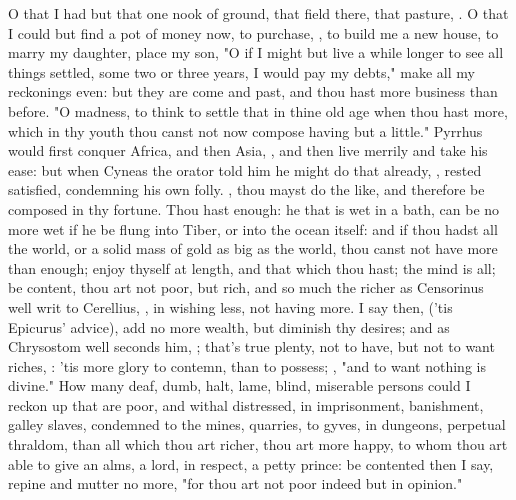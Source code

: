 {O that I had but that one nook of ground, that field there, that pasture, . O that I could but find a pot of money now, to purchase, \etc{}, to build me a new house, to marry my daughter, place my son, \etc{} "O if I might but live a while longer to see all things settled, some two or three years, I would pay my debts," make all my reckonings even: but they are come and past, and thou hast more business than before. "O madness, to think to settle that in thine old age when thou hast more, which in thy youth thou canst not now compose having but a little." Pyrrhus would first conquer Africa, and then Asia, , and then live merrily and take his ease: but when Cyneas the orator told him he might do that already, , rested satisfied, condemning his own folly. , thou mayst do the like, and therefore be composed in thy fortune. Thou hast enough: he that is wet in a bath, can be no more wet if he be flung into Tiber, or into the ocean itself: and if thou hadst all the world, or a solid mass of gold as big as the world, thou canst not have more than enough; enjoy thyself at length, and that which thou hast; the mind is all; be content, thou art not poor, but rich, and so much the richer as Censorinus well writ to Cerellius, , in wishing less, not having more. I say then,  ('tis Epicurus' advice), add no more wealth, but diminish thy desires; and as Chrysostom well seconds him, ; that's true plenty, not to have, but not to want riches, : 'tis more glory to contemn, than to possess; , "and to want nothing is divine." How many deaf, dumb, halt, lame, blind, miserable persons could I reckon up that are poor, and withal distressed, in imprisonment, banishment, galley slaves, condemned to the mines, quarries, to gyves, in dungeons, perpetual thraldom, than all which thou art richer, thou art more happy, to whom thou art able to give an alms, a lord, in respect, a petty prince: be contented then I say, repine and mutter no more, "for thou art not poor indeed but in opinion."

}
